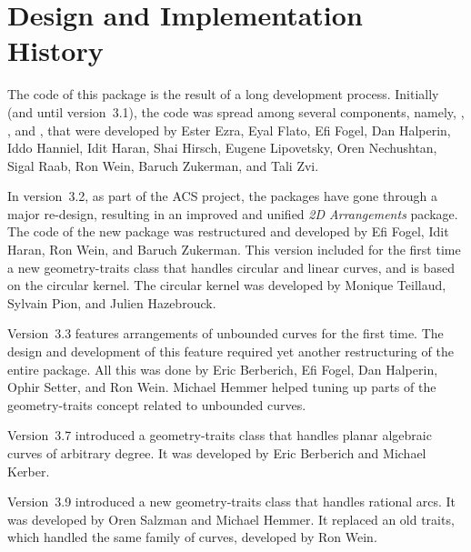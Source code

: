 \section*{Design and Implementation History}

The code of this package is the result of a long development process.
Initially (and until version~3.1), the code was spread among several
components, namely, , ,
 and , that were
developed by Ester Ezra, Eyal Flato, Efi Fogel, Dan Halperin, Iddo
Hanniel, Idit Haran, Shai Hirsch, Eugene Lipovetsky, Oren Nechushtan,
Sigal Raab, Ron Wein, Baruch Zukerman, and Tali Zvi.

In version~3.2, as part of the ACS project, the packages have gone
through a major re-design, resulting in an improved and unified
\emph{2D Arrangements} package.
The code of the new package was restructured and developed by
Efi Fogel, Idit Haran, Ron Wein, and Baruch Zukerman. This
version included for the first time a new geometry-traits
class that handles circular and linear curves, and is based
on the circular kernel. The circular kernel was developed
by Monique Teillaud, Sylvain Pion, and Julien Hazebrouck.

Version~3.3 features arrangements of unbounded curves for the first
time. The design and development of this feature required yet another
restructuring of the entire package. All this was done by Eric
Berberich, Efi Fogel, Dan Halperin, Ophir Setter, and Ron
Wein. Michael Hemmer helped tuning up parts of the geometry-traits 
concept related to unbounded curves.

Version~3.7 introduced a geometry-traits class
that handles planar algebraic curves of arbitrary degree.
It was developed by Eric Berberich and Michael Kerber.

Version~3.9 introduced a new geometry-traits class that handles
rational arcs. It was developed by Oren Salzman and Michael Hemmer.
It replaced an old traits, which handled the same family of
curves, developed by Ron Wein.
